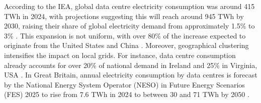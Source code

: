 \documentclass[lettersize,journal]{IEEEtran}
\begin{document}
According to the IEA, global data centre electricity consumption was around 415 TWh in 2024, with projections suggesting this will reach around 945 TWh by 2030, raising their share of global electricity demand from approximately 1.5\% to 3\% \cite{iea_energy_ai}. This expansion is not uniform, with over 80\% of the increase expected to originate from the United States and China \cite{iea_energy_ai}. Moreover, geographical clustering intensifies the impact on local grids. For instance, data centre consumption already accounts for over 20\% of national demand in Ireland and 25\% in Virginia, USA \cite{iea_energy_ai}. In Great Britain, annual electricity consumption by data centres is forecast by the National Energy System Operator (NESO) in Future Energy Scenarios (FES) 2025 to rise from 7.6 TWh in 2024 to between 30 and 71 TWh by 2050 \cite{neso2025future}.
\end{document}
